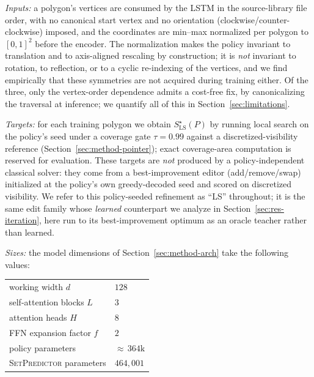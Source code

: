\documentclass[11pt]{article}
\newcommand{\SetPredictor}{\textup{\textsc{SetPredictor}}}
\begin{document}
\medskip

\emph{Inputs:} a polygon's vertices are consumed by the LSTM in the source-library file order, with no canonical start vertex and no orientation (clockwise/counter-clockwise) imposed, and the coordinates are min--max normalized per polygon to $[0,1]^2$ before the encoder. The normalization makes the policy invariant to translation and to axis-aligned rescaling by construction; it is \emph{not} invariant to rotation, to reflection, or to a cyclic re-indexing of the vertices, and we find empirically that these symmetries are not acquired during training either. Of the three, only the vertex-order dependence admits a cost-free fix, by canonicalizing the traversal at inference; we quantify all of this in Section~\ref{sec:limitations}.

\medskip 

\emph{Targets:} for each training polygon we obtain $S^\star_{\mathrm{LS}}(P)$ by running local search on the policy's seed under a coverage gate $\tau = 0.99$ against a discretized-visibility reference (Section~\ref{sec:method-pointer}); exact coverage-area computation is reserved for evaluation. These targets are \emph{not} produced by a policy-independent classical solver: they come from a best-improvement editor (add/remove/swap) initialized at the policy's own greedy-decoded seed and scored on discretized visibility. We refer to this policy-seeded refinement as ``LS'' throughout; it is the same edit family whose \emph{learned} counterpart we analyze in Section~\ref{sec:res-iteration}, here run to its best-improvement optimum as an oracle teacher rather than learned. 

\medskip 

\emph{Sizes:} the model dimensions of Section~\ref{sec:method-arch} take the following values:
\begin{center}\footnotesize
\begin{tabular}{ll}
  \toprule
  working width $d$                & $128$ \\
  self-attention blocks $L$        & $3$ \\
  attention heads $H$              & $8$ \\
  FFN expansion factor $f$         & $2$ \\
  \midrule
  policy parameters                & ${\approx}\,364\text{k}$ \\
  \SetPredictor{} parameters & $464{,}001$ \\
  \bottomrule
\end{tabular}
\end{center}
\end{document}
